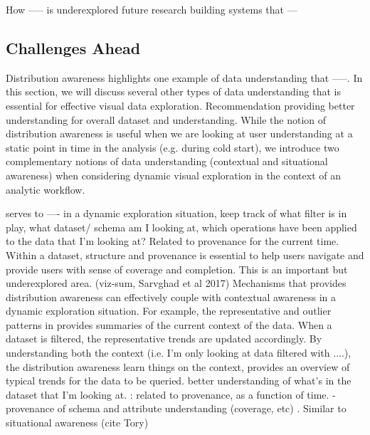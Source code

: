 How ----- is underexplored 
future research 
building systems that ---


\subsection{Challenges Ahead}
\par Distribution awareness highlights one example of data understanding that -----. In this section, we will discuss several other types of data understanding that is essential for effective visual data exploration. Recommendation providing better understanding for overall dataset and understanding. 
While the notion of distribution awareness is useful when we are looking at user understanding at a static point in time in the analysis (e.g. during cold start), we introduce two complementary notions of data understanding (contextual and situational awareness) when considering dynamic visual exploration in the context of an analytic workflow.
	
 serves to ---- in a dynamic exploration situation, keep track of what filter is in play, what dataset/ schema am I looking at, which operations have been applied to the data that I'm looking at? Related to provenance for the current time. 
Within a dataset, structure and provenance is essential to help users navigate and provide users with sense of coverage and completion. This is an important but underexplored area. (viz-sum, Sarvghad et al 2017)
Mechanisms that provides distribution awareness can effectively couple with contextual awareness in a dynamic exploration situation. For example, the representative and outlier patterns in \zv provides summaries of the current context of the data. When a dataset is filtered, the representative trends are updated accordingly. By understanding both the context (i.e. I'm only looking at data filtered with ....), the distribution awareness learn things on the context, provides
an overview of typical trends for the data to be queried. better understanding of what's in the dataset that I'm looking at. 
: 
related to provenance, as a function of time.
- provenance of schema and attribute understanding (coverage, etc) . Similar to situational awareness (cite Tory)


